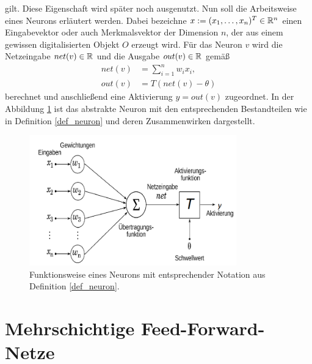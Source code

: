 gilt. Diese Eigenschaft wird später noch ausgenutzt. Nun soll die Arbeitsweise eines Neurons erläutert werden. Dabei bezeichne $x:=(x_1, \ldots, x_n)^{T} \in \mathbb{R}^{n}$ einen Eingabevektor oder auch Merkmalsvektor der Dimension $n$, der aus einem gewissen digitalisierten Objekt $O$ erzeugt wird. Für das Neuron $v$ wird die Netzeingabe $net(v) \in \mathbb{R}$ und die Ausgabe $out(v) \in \mathbb{R}$ gemäß
\begin{align*}
    \label{neuronoutput1}
    net(v) &= \sum_{i=1}^n w_i x_i, \\
    out(v) &= T(net(v)-\theta)
\end{align*} 
berechnet und anschließend eine Aktivierung $y=out(v)$ zugeordnet. In der Abbildung \ref{funktionsweise_neuron} ist das abstrakte Neuron mit den entsprechenden Bestandteilen wie in Definition \ref{def_neuron} und deren Zusammenwirken dargestellt.

\begin{figure}[h]
    \label{funktionsweise_neuron}
    \includegraphics[width=0.8\textwidth]{pics/chapter_neuralnetworks/NeuronModel_wiki_n.png}
    \centering
    \caption{Funktionsweise eines Neurons mit entsprechender Notation aus Definition \ref{def_neuron}.}
\end{figure}

\section{Mehrschichtige Feed-Forward-Netze}